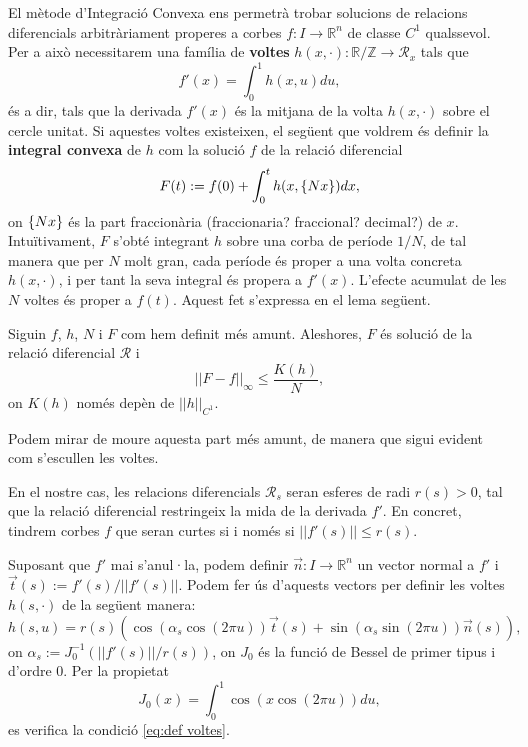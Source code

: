 El mètode d'Integració Convexa ens permetrà trobar solucions de relacions diferencials arbitràriament properes a corbes $f:I\to\mathbb R^n$ de classe $C^1$ qualssevol. Per a això necessitarem una família de \textbf{voltes} $h(x, \cdot): \mathbb R / \mathbb Z \to \mathcal R_x$ tals que 
\begin{equation}\label{eq:def voltes}
    f'(x) = \int_0^1 h(x, u)  du,
\end{equation}
és a dir, tals que la derivada $f'(x)$ és la mitjana de la volta $h(x, \cdot)$ sobre el cercle unitat. Si aquestes voltes existeixen, el següent que voldrem és definir la \textbf{integral convexa} de $h$ com la solució $f$ de la relació diferencial 
\begin{equation*}
    F(t) := f(0) + \int_0^t h(x, \{Nx\})  dx,
\end{equation*}
on $\{Nx\}$ és la part fraccionària {\color{blue} (fraccionaria? fraccional? decimal?)} de $x$. Intuïtivament, $F$ s'obté integrant $h$ sobre una corba de període $1/N$, de tal manera que per $N$ molt gran, cada període és proper a una volta concreta $h(x, \cdot)$, i per tant la seva integral és propera a $f'(x)$. L'efecte acumulat de les $N$ voltes és proper a $f(t)$. Aquest fet s'expressa en el lema següent.

\begin{lema}\label{lema:C0-1D}
    Siguin $f$, $h$, $N$ i $F$ com hem definit més amunt. Aleshores, $F$ és solució de la relació diferencial $\mathcal R$ i 
    \begin{equation}
    ||F-f||_\infty \le \frac{K(h)}{N},
    \end{equation}
    on $K(h)$ només depèn de $||h||_{C^1}$.
\end{lema}

{\color{blue} Podem mirar de moure aquesta part més amunt, de manera que sigui evident com s'escullen les voltes.}

En el nostre cas, les relacions diferencials $\mathcal R_s$ seran esferes de radi $r(s)>0$, tal que la relació diferencial restringeix la mida de la derivada $f'$. En concret, tindrem corbes $f$ que seran curtes si i només si $||f'(s)||\le r(s)$.

Suposant que $f'$ mai s'anul·la, podem definir $\vec n:I\to\mathbb R^n$ un vector normal a $f'$ i $\vec t(s):=f'(s)/||f'(s)||$. Podem fer ús d'aquests vectors per definir les voltes $h(s, \cdot)$ de la següent manera:
\begin{equation}
    h(s, u) = r(s)(\cos(\alpha_s\cos(2\pi u))\vec t(s) + \sin(\alpha_s\sin(2\pi u))\vec n(s)),
\end{equation}
on $\alpha_s := J_0^{-1}(||f'(s)||/r(s))$, on $J_0$ és la funció de Bessel de primer tipus i d'ordre 0. Per la propietat
\begin{equation}
    J_0(x) = \int_0^1 \cos(x\cos(2\pi u)) du,
\end{equation}
es verifica la condició \ref{eq:def voltes}.

